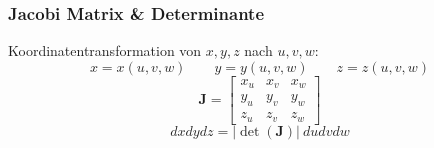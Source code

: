 \subsubsection{Jacobi Matrix \& Determinante}
    Koordinatentransformation von $x,y,z$ nach $u,v,w$:
    $$
    x = x(u,v,w) \qquad y = y(u,v,w) \qquad z = z(u,v,w)
    $$
    $$
        \boldsymbol{J} = \begin{bmatrix}
            x_u & x_v & x_w\\
            y_u & y_v & y_w\\
            z_u & z_v & z_w
        \end{bmatrix}
    $$
    $$
        dx dy dz = \lvert \det(\boldsymbol{J}) \rvert \ du dv dw
    $$
